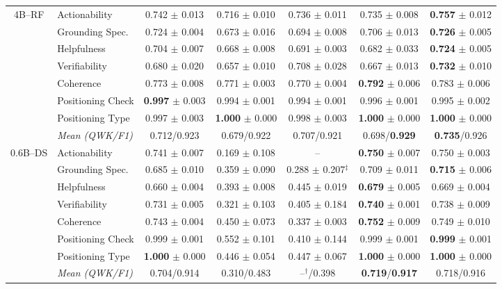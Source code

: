 \begin{table}[!t]
{\begin{tabular*}{\textwidth}{@{\extracolsep{\fill}}clccccc@{}}
\multirow{8}{*}{4B--RF}
& Actionability & 0.742 $\pm$ 0.013 & 0.716 $\pm$ 0.010 & 0.736 $\pm$ 0.011 & 0.735 $\pm$ 0.008 & \textbf{0.757} $\pm$ 0.012 \\
& Grounding Spec. & 0.724 $\pm$ 0.004 & 0.673 $\pm$ 0.016 & 0.694 $\pm$ 0.008 & 0.706 $\pm$ 0.013 & \textbf{0.726} $\pm$ 0.005 \\
& Helpfulness & 0.704 $\pm$ 0.007 & 0.668 $\pm$ 0.008 & 0.691 $\pm$ 0.003 & 0.682 $\pm$ 0.033 & \textbf{0.724} $\pm$ 0.005 \\
& Verifiability & 0.680 $\pm$ 0.020 & 0.657 $\pm$ 0.010 & 0.708 $\pm$ 0.028 & 0.667 $\pm$ 0.013 & \textbf{0.732} $\pm$ 0.010 \\
\cmidrule(lr){2-7}
& Coherence & 0.773 $\pm$ 0.008 & 0.771 $\pm$ 0.003 & 0.770 $\pm$ 0.004 & \textbf{0.792} $\pm$ 0.006 & 0.783 $\pm$ 0.006 \\
& Positioning Check & \textbf{0.997} $\pm$ 0.003 & 0.994 $\pm$ 0.001 & 0.994 $\pm$ 0.001 & 0.996 $\pm$ 0.001 & 0.995 $\pm$ 0.002 \\
& Positioning Type & 0.997 $\pm$ 0.003 & \textbf{1.000} $\pm$ 0.000 & 0.998 $\pm$ 0.003 & \textbf{1.000} $\pm$ 0.000 & \textbf{1.000} $\pm$ 0.000 \\
& \textit{Mean (QWK/F1)} & 0.712/0.923 & 0.679/0.922 & 0.707/0.921 & 0.698/\textbf{0.929} & \textbf{0.735}/0.926 \\
\midrule

\multirow{8}{*}{0.6B--DS}
& Actionability & 0.741 $\pm$ 0.007 & 0.169 $\pm$ 0.108 & -- & \textbf{0.750} $\pm$ 0.007 & 0.750 $\pm$ 0.003 \\
& Grounding Spec. & 0.685 $\pm$ 0.010 & 0.359 $\pm$ 0.090 & 0.288 $\pm$ 0.207$^{\ddagger}$ & 0.709 $\pm$ 0.011 & \textbf{0.715} $\pm$ 0.006 \\
& Helpfulness & 0.660 $\pm$ 0.004 & 0.393 $\pm$ 0.008 & 0.445 $\pm$ 0.019 & \textbf{0.679} $\pm$ 0.005 & 0.669 $\pm$ 0.004 \\
& Verifiability & 0.731 $\pm$ 0.005 & 0.321 $\pm$ 0.103 & 0.405 $\pm$ 0.184 & \textbf{0.740} $\pm$ 0.001 & 0.738 $\pm$ 0.009 \\
\cmidrule(lr){2-7}
& Coherence & 0.743 $\pm$ 0.004 & 0.450 $\pm$ 0.073 & 0.337 $\pm$ 0.003 & \textbf{0.752} $\pm$ 0.009 & 0.749 $\pm$ 0.010 \\
& Positioning Check & 0.999 $\pm$ 0.001 & 0.552 $\pm$ 0.101 & 0.410 $\pm$ 0.144 & 0.999 $\pm$ 0.001 & \textbf{0.999} $\pm$ 0.001 \\
& Positioning Type & \textbf{1.000} $\pm$ 0.000 & 0.446 $\pm$ 0.054 & 0.447 $\pm$ 0.067 & \textbf{1.000} $\pm$ 0.000 & \textbf{1.000} $\pm$ 0.000 \\
& \textit{Mean (QWK/F1)} & 0.704/0.914 & 0.310/0.483 & --$^{\dagger}$/0.398 & \textbf{0.719}/\textbf{0.917} & 0.718/0.916 \\
\midrule


\end{tabular*}}
\end{table}
